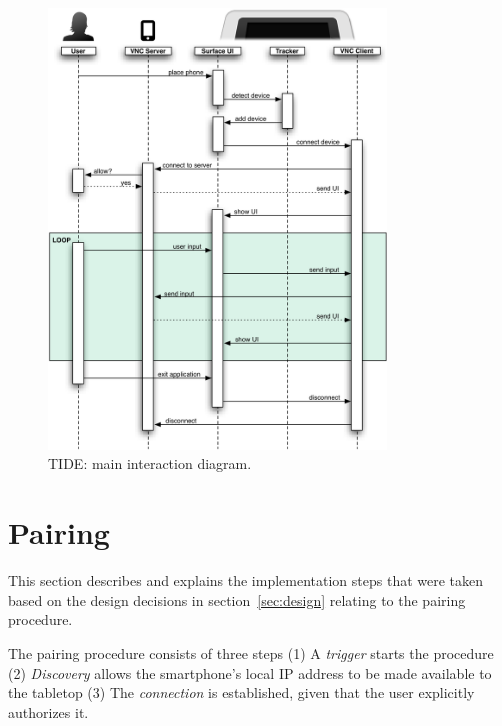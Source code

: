 \begin{figure}[htb]
  \centering
    \includegraphics[width=0.8\textwidth]{images/sequenceOverview}
    \caption{TIDE: main interaction diagram.}
    \label{fig:sequenceOverview}
\end{figure}



\section{Pairing}
\label{sec:pairing}

This section describes and explains the implementation steps that were taken based on the design decisions in section~\ref{sec:design} relating to the pairing procedure.


The pairing procedure consists of three steps
(1) A \emph{trigger} starts the procedure
(2) \emph{Discovery} allows the smartphone's local IP address to be made available to the tabletop
(3) The \emph{connection} is established, given that the user explicitly authorizes it.

